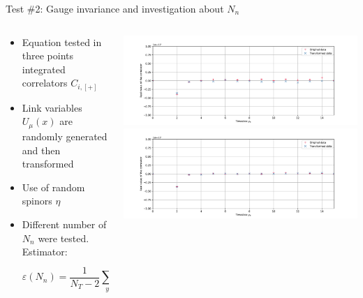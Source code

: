 \documentclass{beamer}
\begin{document}
\begin{frame}{Test \#2: Gauge invariance and investigation about $N_n$}
      \begin{columns}
            \begin{column}{0.43\textwidth}
                  \begin{itemize}
                        \item Equation tested in three points integrated correlators $C_{i,[+]}$
                        \item Link variables $U_\mu (x)$ are randomly generated and then transformed
                        \item Use of random spinors $\eta$
                        \item Different number of $N_n$ were tested. Estimator:
                        \begin{equation*}
                              \varepsilon(N_n) = \frac{1}{N_T-2}\sum_{y_4}\left(\frac{|C(y_4)-\tilde C(y_4)|}{C(y_4)+\tilde C(y_4)}\right)
                        \end{equation*}
                  \end{itemize}
            \end{column}
            \begin{column}{0.57\textwidth}
                  \begin{center}
                        \includegraphics[width=.8\textwidth]{../thesis-tex/imgs-MSc-thesis/check2-20.pdf}\\
                        \includegraphics[width=.8\textwidth]{../thesis-tex/imgs-MSc-thesis/check2-100.pdf}
                  \end{center}
            \end{column}
      \end{columns}
\end{frame}
\end{document}

